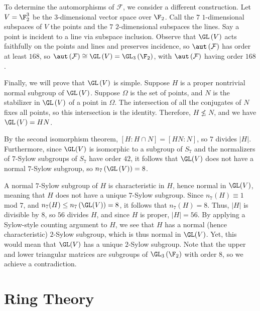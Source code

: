 \documentclass[10pt]{mypackage}
\begin{document}
To determine the automorphisms of $\mathcal{F}$, we consider a different construction. Let $V = \F_2^{3}$ be the $3$-dimensional vector space over $\F_2$. Call the $7$ $1$-dimensional subspaces of $V$ the points and the $7$ $2$-dimensional subspaces the lines. Say a point is incident to a line via subspace inclusion. Observe that $\GL\left( V \right)$ acts faithfully on the points and lines and preserves incidence, so $\aut\left( \mathcal{F} \right)$ has order at least $168$, so $\aut\left( \mathcal{F} \right)\cong \GL\left( V \right) = \GL_3\left( \F_2 \right)$, with $\aut\left( \mathcal{F} \right)$ having order $168$.

Finally, we will prove that $\GL\left( V \right)$ is simple. Suppose $H$ is a proper nontrivial normal subgroup of $\GL\left( V \right)$. Suppose $\Omega$ is the set of points, and $N$ is the stabilizer in $\GL\left( V \right)$ of a point in $\Omega$. The intersection of all the conjugates of $N$ fixes all points, so this intersection is the identity. Therefore, $H\nleq N$, and we have $\GL\left( V \right) = HN$.

By the second isomorphism theorem, $\left[ H:H\cap N \right] = \left[ HN:N \right]$, so $7$ divides $\left\vert H \right\vert$. Furthermore, since $\GL(V)$ is isomorphic to a subgroup of $S_7$ and the normalizers of $7$-Sylow subgroups of $S_7$ have order $42$, it follows that $\GL(V)$ does not have a normal $7$-Sylow subgroup, so $n_7\left( \GL\left( V \right) \right) = 8$. 

A normal $7$-Sylow subgroup of $H$ is characteristic in $H$, hence normal in $\GL(V)$, meaning that $H$ does not have a unique $7$-Sylow subgroup. Since $n_7(H)\equiv 1$ mod $7$, and $n_7(H)\leq n_7\left( \GL(V) \right) = 8$, it follows that $n_7(H) = 8$. Thus, $\left\vert H \right\vert$ is divisible by $8$, so $56$ divides $H$, and since $H$ is proper, $\left\vert H \right\vert = 56$. By applying a Sylow-style counting argument to $H$, we see that $H$ has a normal (hence characteristic) $2$-Sylow subgroup, which is thus normal in $\GL(V)$. Yet, this would mean that $\GL(V)$ has a unique $2$-Sylow subgroup. Note that the upper and lower triangular matrices are subgroups of $\GL_3\left( \F_2 \right)$ with order $8$, so we achieve a contradiction.
\section{Ring Theory}%
\end{document}
